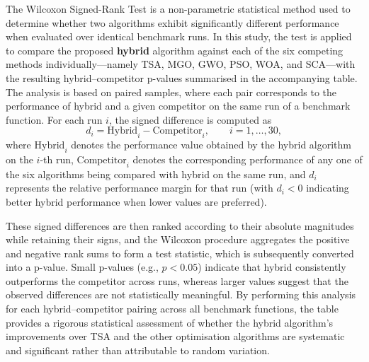 \documentclass[12pt,a4paper]{article}
\begin{document}
The Wilcoxon Signed-Rank Test is a non-parametric statistical method used to determine whether two algorithms exhibit significantly different performance when evaluated over identical benchmark runs. In this study, the test is applied to compare the proposed \textbf{hybrid} algorithm against each of the six competing methods individually—namely TSA, MGO, GWO, PSO, WOA, and SCA—with the resulting hybrid–competitor p-values summarised in the accompanying table. The analysis is based on paired samples, where each pair corresponds to the performance of hybrid and a given competitor on the same run of a benchmark function. For each run \(i\), the signed difference is computed as
\[
d_{i} = \mathrm{Hybrid}_{i} - \mathrm{Competitor}_{i}, 
\qquad i = 1,\ldots,30,
\]
where \(\mathrm{Hybrid}_{i}\) denotes the performance value obtained by the hybrid algorithm on the \(i\)-th run, \(\mathrm{Competitor}_{i}\) denotes the corresponding performance of any one of the six algorithms being compared with hybrid on the same run, and \(d_{i}\) represents the relative performance margin for that run (with \(d_{i}<0\) indicating better hybrid performance when lower values are preferred).

These signed differences are then ranked according to their absolute magnitudes while retaining their signs, and the Wilcoxon procedure aggregates the positive and negative rank sums to form a test statistic, which is subsequently converted into a p-value. Small p-values (e.g., \(p<0.05\)) indicate that hybrid consistently outperforms the competitor across runs, whereas larger values suggest that the observed differences are not statistically meaningful. By performing this analysis for each hybrid–competitor pairing across all benchmark functions, the table provides a rigorous statistical assessment of whether the hybrid algorithm’s improvements over TSA and the other optimisation algorithms are systematic and significant rather than attributable to random variation.
\end{document}
